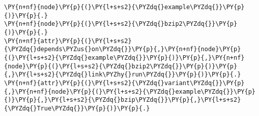 \begin{Verbatim}[commandchars=\\\{\},fontsize=\footnotesize]
\PY{n+nf}{node}\PY{p}{(}\PY{l+s+s2}{\PYZdq{}example\PYZdq{}}\PY{p}{)}\PY{p}{.}
\PY{n+nf}{node}\PY{p}{(}\PY{l+s+s2}{\PYZdq{}bzip2\PYZdq{}}\PY{p}{)}\PY{p}{.}
\PY{n+nf}{attr}\PY{p}{(}\PY{l+s+s2}{\PYZdq{}depends\PYZus{}on\PYZdq{}}\PY{p}{,}\PY{n+nf}{node}\PY{p}{(}\PY{l+s+s2}{\PYZdq{}example\PYZdq{}}\PY{p}{)}\PY{p}{,}\PY{n+nf}{node}\PY{p}{(}\PY{l+s+s2}{\PYZdq{}bzip2\PYZdq{}}\PY{p}{)}\PY{p}{,}\PY{l+s+s2}{\PYZdq{}link\PYZhy{}run\PYZdq{}}\PY{p}{)}\PY{p}{.}
\PY{n+nf}{attr}\PY{p}{(}\PY{l+s+s2}{\PYZdq{}variant\PYZdq{}}\PY{p}{,}\PY{n+nf}{node}\PY{p}{(}\PY{l+s+s2}{\PYZdq{}example\PYZdq{}}\PY{p}{)}\PY{p}{,}\PY{l+s+s2}{\PYZdq{}bzip\PYZdq{}}\PY{p}{,}\PY{l+s+s2}{\PYZdq{}True\PYZdq{}}\PY{p}{)}\PY{p}{.}
\end{Verbatim}
